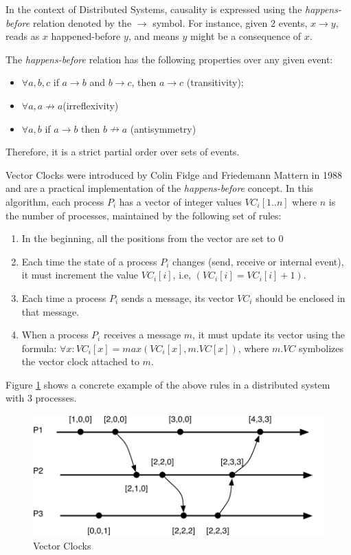 In the context of Distributed Systems, causality is expressed using the
\textit{happens-before} relation \cite{Lamport:1978} denoted by the
$\rightarrow$ symbol. For instance, given 2 events, $x \rightarrow y$, reads
as $x$ happened-before $y$, and means $y$ might be a consequence of
$x$.

The \textit{happens-before} relation has the following properties over any given event:
\begin{itemize}
\item $\forall a,b,c$ if $a \rightarrow b$ and $b\rightarrow c$, then $a
  \rightarrow c$ (transitivity);
\item $\forall a, a \nrightarrow a$(irreflexivity)
\item $\forall a,b$ if $a \rightarrow b$ then $b \nrightarrow a$ (antisymmetry)
\end{itemize}

Therefore, it is a  strict partial order over
sets of events.

Vector Clocks were introduced by Colin Fidge \cite{Fidge} and Friedemann Mattern
\cite{Mattern} in 1988 and are a practical implementation of the
\textit{happens-before} concept.
In this algorithm, each process $P_i$ has a vector of integer values
$VC_i[1..n]$ where $n$ is the number of processes, maintained by the following
set of rules:
\begin{enumerate}
\item In the beginning, all the positions from the vector are set to 0
\item Each time the state of a process $P_i$ changes (send, receive or
  internal event), it must increment
  the value $VC_i[i]$, i.e, $(VC_i[i] = VC_i[i]+1)$.
\item Each time a process $P_i$ sends a message, its vector $VC_i$
  should be enclosed in that message.
\item When a process $P_i$ receives a message $m$, it must update its
  vector using the formula: $\forall x:VC_i[x] = max(VC_i[x],m.VC[x])$,
  where $m.VC$ symbolizes the vector clock attached to $m$.
\end{enumerate}

Figure \ref{fig:vector_clocks} shows a concrete example of the above
rules in a distributed system with 3 processes.

\begin{figure}[htb]
  \centering
  \includegraphics[width=\textwidth]{images/vector_clocks.pdf}
  \caption{ Vector Clocks}
  \label{fig:vector_clocks}
\end{figure}

